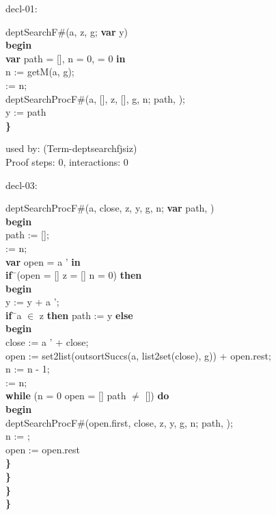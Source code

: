 \documentclass[a4paper]{article}
\begin{document}
\raggedright
              
decl-01: 
\begin{tabbing}
deptSearchF\#(a, z, g; {\bf var} y)\\
{\bf be}\= {\bf gin}\+ \\ 


{\bf var} path = [], n = 0,  = 0 {\bf in} \\ 
n := getM(a, g); \\ 
  := n; \\ 
 deptSearchProcF\#(a, [], z, [], g, n; path, ); \\ 
 y := path \- \\ 
 {\bf \}} 
\end{tabbing}

used by: (Term-deptsearchfjsiz)\\
Proof steps: 0, interactions: 0

\medskip

decl-03: 
\begin{tabbing}
deptSearchProcF\#(a, close, z, y, g, n; {\bf var} path, )\\
{\bf be}\= {\bf gin}\+ \\ 
path := []; \\ 
  := n; \\ 
 

{\bf var} open = a ' {\bf in} \\ 

{\bf if}\=\ \Not (open = [] \Or z = [] \Or n = 0) {\bf then} \+\\ 
 {\bf be}\= {\bf gin} \+ \\ 
 y := y + a '; \\ 
 
{\bf if}\=\ a $\in$ z {\bf then} path := y {\bf else} \+\\ 
 {\bf be}\= {\bf gin} \+ \\ 
 close := a ' + close; \\ 
 open := set2list(outsortSuccs(a, list2set(close), g)) + open.rest; \\ 
 n := n - 1; \\ 
  := n; \\ 
 {\bf wh}\={\bf ile} \Not (n = 0 \Or open = [] \Or path $\neq$ []) {\bf do} \+\\ 
{\bf be}\= {\bf gin} \+ \\ 
 deptSearchProcF\#(open.first, close, z, y, g, n; path, ); \\ 
 n := ; \\ 
 open := open.rest \- \\ 
 {\bf \}}\- \- \\ 
 {\bf \}}\- \- \\ 
 {\bf \}} \- \- \\ 
 {\bf \}} 
\end{tabbing}
\end{document}

